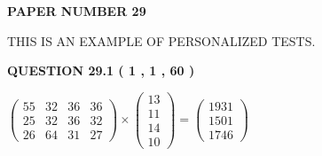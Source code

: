 \documentclass[12pt]{article}
\begin{document}
   
   
   
\newpage 
\setcounter{page}{ 
    29001 } 
   
   
   
   
 {\textbf{ \Large{ PAPER NUMBER           29  }}}
   
   
\vspace{0.2in}
   
   
   
   
   
   
 \vspace{0.2in}
{\Huge  THIS IS AN EXAMPLE OF}
{\Huge  PERSONALIZED TESTS. }
   
   
  
\vspace{0.2in}
  
{\textbf{\Large{QUESTION
29.1 
 (           1 ,           1 ,          60 )
}}}
  
  
 
 
\noindent{}

 
$\left( \begin{array}{ccccccccccccccc}
          55  & 
          32  & 
          36  & 
          36  \\ 
          25  & 
          32  & 
          36  & 
          32  \\ 
          26  & 
          64  & 
          31  & 
          27
\end{array}\right) \times
\left( \begin{array}{c}
          13  \\ 
          11  \\ 
          14  \\ 
          10
\end{array}\right)  =
\left( \begin{array}{c}
        1931  \\ 
        1501  \\ 
        1746
\end{array}\right)  $
 
\end{document}
